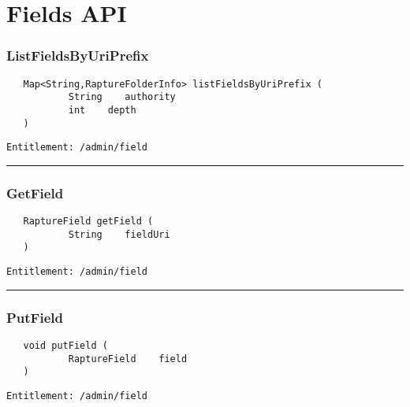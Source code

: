 \chapter{Fields API}

\subsection{ListFieldsByUriPrefix}
\label{Api:ListFieldsByUriPrefix}
\begin{verbatim}
   Map<String,RaptureFolderInfo> listFieldsByUriPrefix (
           String    authority
           int    depth
   )
\end{verbatim}
\begin{Verbatim}[fontsize=\small, formatcom=\color{Maroon}]
  Entitlement: /admin/field
\end{Verbatim}



\rule{12cm}{2pt}
\subsection{GetField}
\label{Api:GetField}
\begin{verbatim}
   RaptureField getField (
           String    fieldUri
   )
\end{verbatim}
\begin{Verbatim}[fontsize=\small, formatcom=\color{Maroon}]
  Entitlement: /admin/field
\end{Verbatim}



\rule{12cm}{2pt}
\subsection{PutField}
\label{Api:PutField}
\begin{verbatim}
   void putField (
           RaptureField    field
   )
\end{verbatim}
\begin{Verbatim}[fontsize=\small, formatcom=\color{Maroon}]
  Entitlement: /admin/field
\end{Verbatim}



